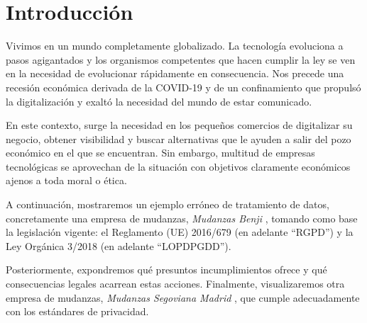 \part{Introducción}
Vivimos en un mundo completamente globalizado. La tecnología evoluciona a pasos agigantados y los organismos competentes que hacen cumplir la ley se ven en la necesidad de evolucionar rápidamente en consecuencia. Nos precede una recesión económica derivada de la COVID-19 y de un confinamiento que propulsó la digitalización y exaltó la necesidad del mundo de estar comunicado.

En este contexto, surge la necesidad en los pequeños comercios de digitalizar su negocio, obtener visibilidad y buscar alternativas que le ayuden a salir del pozo económico en el que se encuentran. Sin embargo, multitud de empresas tecnológicas se aprovechan de la situación con objetivos claramente económicos ajenos a toda moral o ética.

A continuación, mostraremos un ejemplo erróneo de tratamiento de datos, concretamente una empresa de mudanzas, \textit{Mudanzas Benji} \cite{benji}, tomando como base la legislación vigente: el Reglamento (UE) 2016/679 \cite{RGPD} (en adelante ``RGPD'') y la Ley Orgánica 3/2018 \cite{LOPDPGDD} (en adelante ``LOPDPGDD'').

Posteriormente, expondremos qué presuntos incumplimientos ofrece y qué consecuencias legales acarrean estas acciones. Finalmente, visualizaremos otra empresa de mudanzas, \textit{Mudanzas Segoviana Madrid} \cite{alcorcon}, que cumple adecuadamente con los estándares de privacidad.

